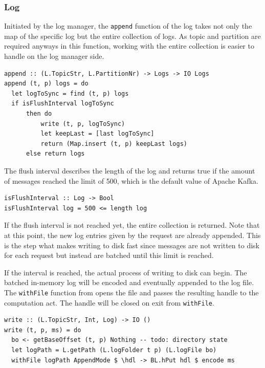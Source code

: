 \subsubsection{Log}

Initiated by the log manager, the \lstinline{append} function of the log takes
not only the map of the specific log but the entire collection of logs. As topic
and partition are required anyways in this function, working with the entire
collection is easier to handle on the log manager side.

\begin{lstlisting}[caption={Append messages to log}]
append :: (L.TopicStr, L.PartitionNr) -> Logs -> IO Logs
append (t, p) logs = do
  let logToSync = find (t, p) logs
  if isFlushInterval logToSync
      then do
          write (t, p, logToSync)
          let keepLast = [last logToSync]
          return (Map.insert (t, p) keepLast logs)
      else return logs
\end{lstlisting}

The flush interval describes the length of the log and returns true if the
amount of messages reached the limit of 500, which is the default value of
Apache Kafka.

\begin{lstlisting}[caption={Check if enough messages are given for flush to disk}]
isFlushInterval :: Log -> Bool
isFlushInterval log = 500 <= length log
\end{lstlisting}

If the flush interval is not reached yet, the entire collection is returned.
Note that at this point, the new log entries given by the request are already
appended. This is the step what makes writing to disk fast since messages are
not written to disk for each request but instead are batched until this limit is
reached.

If the interval is reached, the actual process of writing to disk can begin.
The batched in-memory log will be encoded and eventually appended to the log
file. The \lstinline{withFile} function from  opens
the file and passes the resulting handle to the computation act. The handle
will be closed on exit from \lstinline{withFile}.

\begin{lstlisting}[caption={Write message to file in AppendMode}]
write :: (L.TopicStr, Int, Log) -> IO ()
write (t, p, ms) = do
  bo <- getBaseOffset (t, p) Nothing -- todo: directory state
  let logPath = L.getPath (L.logFolder t p) (L.logFile bo)
  withFile logPath AppendMode $ \hdl -> BL.hPut hdl $ encode ms
\end{lstlisting}


